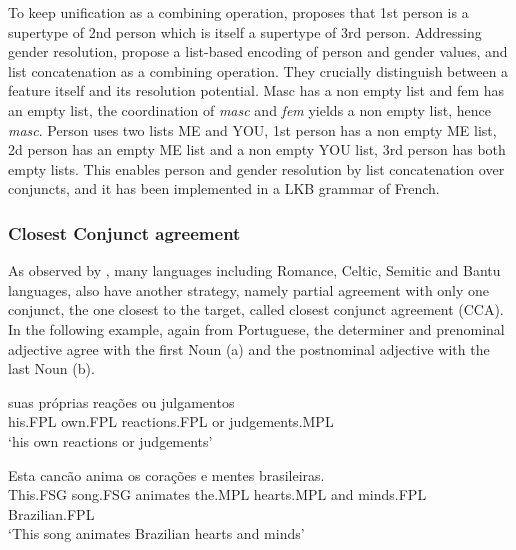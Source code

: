 \documentclass[output=paper
                ,modfonts
                ,nonflat
	        ,collection
	        ,collectionchapter
	        ,collectiontoclongg
 	        ,biblatex
                ,babelshorthands
                ,newtxmath
                ,draftmode
                ,colorlinks, citecolor=brown
]{./langsci/langscibook}
\begin{document}
To keep unification as a combining operation, \citet{Sag:03} proposes that 1st person is a supertype of 2nd person which is itself a supertype of 3rd person. Addressing gender resolution, \citet{Aguila:Crysmann:18} propose a list-based encoding of person and gender values, and list concatenation as a combining operation. They crucially distinguish between a feature itself and its resolution potential. Masc has a non empty list and fem has an empty list, the coordination of \textit{masc} and \textit{fem} yields a non empty list, hence \textit{masc}. Person uses two lists ME and YOU, 1st person has a non empty ME list, 2d person has an empty ME list and a non empty YOU list, 3rd person has both empty lists. This enables person and gender resolution by list concatenation over conjuncts, and it has been implemented in a LKB grammar of French.

\subsubsection{Closest Conjunct agreement}

%

As observed by \citet{Corbet91}, many languages including Romance, Celtic, Semitic and Bantu languages, also have another strategy, namely partial agreement with only one conjunct, the one closest to the target, called closest conjunct agreement (CCA). 
In the following example, again from Portuguese, the determiner and prenominal adjective agree with the first Noun (a) and the postnominal adjective with the last Noun (b).

\begin{exe}
 \ex
\begin{xlista}
\ex \gll suas pr\'{o}prias rea\c{c}\~{o}es ou julgamentos \\
his.FPL own.FPL reactions.FPL or judgements.MPL \\
\glt `his own reactions or judgements'\\
\citep[435]{Villavicencio:Sadler:ea:05} 


\ex \gll Esta canc\~{a}o anima os cora\c{c}\~{o}es e mentes brasileiras. \\
 This.FSG  song.FSG animates the.MPL hearts.MPL and minds.FPL Brazilian.FPL \\
\glt `This song animates Brazilian hearts and minds'\\
\citep[437]{Villavicencio:Sadler:ea:05} 
\end{xlista}
\end{exe}
\end{document}
